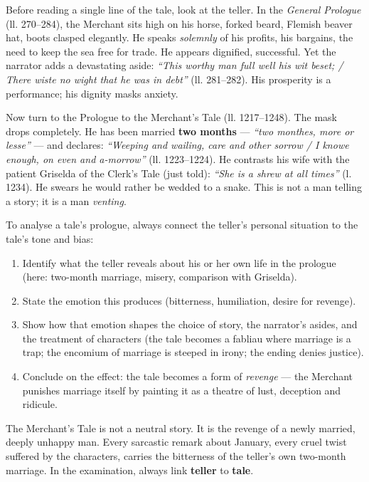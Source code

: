\documentclass[11pt]{article}
\newcommand{\cle}[1]{{\popxbold\color{popdark}#1}}
\begin{document}
\begin{experience}
Before reading a single line of the tale, look at the teller. In the \emph{General Prologue} (ll. 270--284), the Merchant sits high on his horse, forked beard, Flemish beaver hat, boots clasped elegantly. He speaks \emph{solemnly} of his profits, his bargains, the need to keep the sea free for trade. He appears dignified, successful. Yet the narrator adds a devastating aside: \emph{``This worthy man full well his wit beset; / There wiste no wight that he was in debt''} (ll. 281--282). His prosperity is a performance; his dignity masks anxiety.
\par\smallskip
Now turn to the \cle{Prologue to the Merchant's Tale} (ll. 1217--1248). The mask drops completely. He has been married \textbf{two months} --- \emph{``two monthes, more or lesse''} --- and declares: \emph{``Weeping and wailing, care and other sorrow / I knowe enough, on even and a-morrow''} (ll. 1223--1224). He contrasts his wife with the patient Griselda of the Clerk's Tale (just told): \emph{``She is a shrew at all times''} (l. 1234). He swears he would rather be wedded to a snake. This is not a man telling a story; it is a man \emph{venting}.
\end{experience}

\begin{methode}
To analyse a tale's prologue, always connect the teller's personal situation to the tale's tone and bias:
\begin{enumerate}
\item Identify what the teller reveals about his or her own life in the prologue (here: two-month marriage, misery, comparison with Griselda).
\item State the emotion this produces (bitterness, humiliation, desire for revenge).
\item Show how that emotion shapes the choice of story, the narrator's asides, and the treatment of characters (the tale becomes a fabliau where marriage is a trap; the encomium of marriage is steeped in irony; the ending denies justice).
\item Conclude on the effect: the tale becomes a form of \emph{revenge} --- the Merchant punishes marriage itself by painting it as a theatre of lust, deception and ridicule.
\end{enumerate}
\end{methode}

\begin{aretenir}
The Merchant's Tale is not a neutral story. It is the revenge of a newly married, deeply unhappy man. Every sarcastic remark about January, every cruel twist suffered by the characters, carries the bitterness of the teller's own two-month marriage. In the examination, always link \textbf{teller} to \textbf{tale}.
\end{aretenir}
\end{document}
